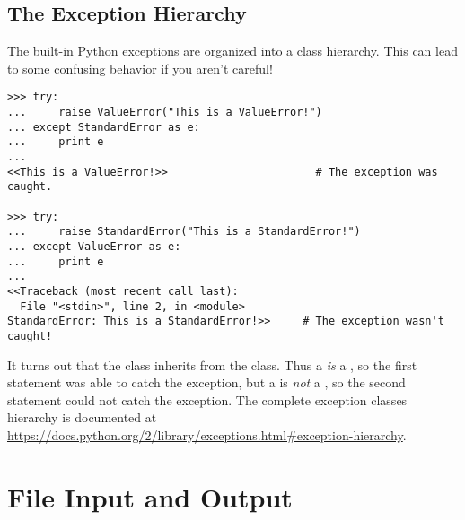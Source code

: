 \begin{comment}
\subsection*{Chaining Exceptions}
\begin{lstlisting}
>>> try:
>>>     raise ValueError("First Exception")
>>> except ValueError as e:
>>>     raise TypeError("Second Exception") from e
\end{lstlisting}
This syntax makes it possible to see where an error originated from and to ``pass it up'' to the next process.
\end{comment}

\subsection*{The Exception Hierarchy} %

The built-in Python exceptions are organized into a class hierarchy.
This can lead to some confusing behavior if you aren't careful!

\begin{lstlisting}
>>> try:
...     raise ValueError("This is a ValueError!")
... except StandardError as e:
...     print e
...
<<This is a ValueError!>>                       # The exception was caught.

>>> try:
...     raise StandardError("This is a StandardError!")
... except ValueError as e:
...     print e
...
<<Traceback (most recent call last):
  File "<stdin>", line 2, in <module>
StandardError: This is a StandardError!>>     # The exception wasn't caught!
\end{lstlisting}

It turns out that the  class inherits from the  class.
Thus a  \emph{is} a , so the first  statement was able to catch the exception, but a  is \emph{not} a , so the second  statement could not catch the exception.
The complete exception classes hierarchy is documented at \url{https://docs.python.org/2/library/exceptions.html#exception-hierarchy}.

\section*{File Input and Output} %


